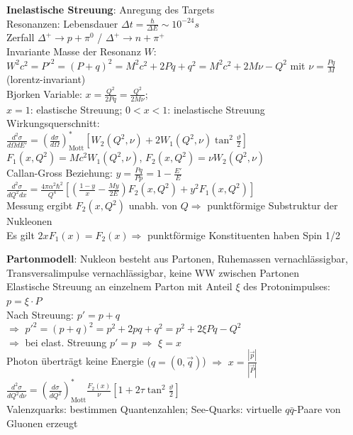 \documentclass[10pt,twoside,a4paper]{article}
\begin{document}
\begin{multicols*}{3}
\textbf{Inelastische Streuung}: Anregung des Targets \\
Resonanzen: Lebensdauer $\Delta t = \frac{\hbar}{\Delta E} \sim 10^{-24} s$ \\
Zerfall $\Delta^+ \to p + \pi^0$ / $\Delta^+ \to n + \pi^+$ \\
Invariante Masse der Resonanz $W$: $W^2 c^2 = P'^2 = (P + q)^2 = M^2 c^2 + 2 P q + q^2 = M^2 c^2 + 2 M \nu - Q^2$ mit $\nu = \frac{P q}{M}$ (lorentz-invariant) \\
Bjorken Variable: $x=\frac{Q^2}{2 P q} = \frac{Q^2}{2 M \nu}$; \\
$x=1$: elastische Streuung; $0<x<1$: inelastische Streuung \\
Wirkungsquerschnitt: \\
$\frac{d^2 \sigma}{d\Omega dE'} = \left( \frac{d\sigma}{d\Omega} \right)^*_{\text{Mott}} \left[ W_2(Q^2, \nu) + 2 W_1(Q^2, \nu) \tan^2 \frac{\vartheta}{2} \right]$ \\
$F_1(x,Q^2) = M c^2 W_1(Q^2, \nu)$, $F_2(x,Q^2) = \nu W_2(Q^2, \nu)$ \\
Callan-Gross Beziehung: $y = \frac{P q}{P p} = 1 - \frac{E'}{E}$ \\
$\scriptscriptstyle\frac{d^2\sigma}{dQ^2 dx} = \frac{4 \pi \alpha^2 \hbar^2}{Q^4} \left[ \left( \frac{1-y}{x} - \frac{M y}{2 E} \right) F_2(x,Q^2) + y^2 F_1(x,Q^2) \right]$ \\
Messung ergibt $F_2(x,Q^2)$ unabh. von $Q \Rightarrow$ punktförmige Substruktur der Nukleonen \\
Es gilt $2 x F_1(x) = F_2(x) \Rightarrow$ punktförmige Konstituenten haben Spin 1/2

\textbf{Partonmodell}: Nukleon besteht aus Partonen, Ruhemassen vernachlässigbar, Transversalimpulse vernachlässigbar, keine WW zwischen Partonen \\
Elastische Streuung an einzelnem Parton mit Anteil $\xi$ des Protonimpulses: $p = \xi \cdot P$ \\
Nach Streuung: $p' = p + q$ \\
$\Rightarrow$ $p'^2 = (p + q)^2 = p^2 + 2 p q + q^2 = p^2 + 2 \xi P q - Q^2$ \\
$\Rightarrow$ bei elast. Streuung $p' = p$ $\Rightarrow$ $\xi = x$ \\
Photon überträgt keine Energie ($q = (0,\vec{q})$) $\Rightarrow$ $x = \frac{|\vec{p}|}{|\vec{P}|}$ \\
$\frac{d^2\sigma}{dQ^2 d\nu} = \left( \frac{d\sigma}{dQ^2} \right)^*_{\text{Mott}} \frac{F_2(x)}{\nu} \left[ 1 + 2\tau \tan^2 \frac{\vartheta}{2} \right]$ \\
Valenzquarks: bestimmen Quantenzahlen; See-Quarks: virtuelle $q\bar{q}$-Paare von Gluonen erzeugt


\end{multicols*}
\end{document}
